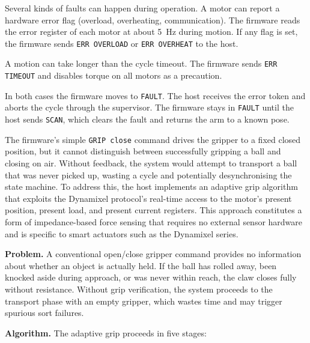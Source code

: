 Several kinds of faults can happen during operation.
A motor can report a hardware error flag (overload, overheating,
communication). The firmware reads the error register of each motor
at about 5~Hz during motion. If any flag is set, the firmware sends
\texttt{ERR OVERLOAD} or \texttt{ERR OVERHEAT} to the host.

A motion can take longer than the cycle timeout. The firmware sends
\texttt{ERR TIMEOUT} and disables torque on all motors as a
precaution.

In both cases the firmware moves to \texttt{FAULT}. The host receives
the error token and aborts the cycle through the supervisor.
The firmware stays in
\texttt{FAULT} until the host sends \texttt{SCAN}, which clears the
fault and returns the arm to a known pose.



The firmware's simple \texttt{GRIP close} command drives the gripper
to a fixed closed position, but it cannot distinguish between
successfully gripping a ball and closing on air. Without feedback,
the system would attempt to transport a ball that was never picked
up, wasting a cycle and potentially desynchronising the state
machine. To address this, the host implements an adaptive grip
algorithm that exploits the Dynamixel protocol's real-time access
to the motor's present position, present load, and present current
registers. This approach constitutes a form of impedance-based
force sensing that requires no external sensor hardware and is
specific to smart actuators such as the Dynamixel series.

\textbf{Problem.} A conventional open/close gripper command
provides no information about whether an object is actually held.
If the ball has rolled away, been knocked aside during approach,
or was never within reach, the claw closes fully without
resistance. Without grip verification, the system proceeds to the
transport phase with an empty gripper, which wastes time and may
trigger spurious sort failures.

\textbf{Algorithm.} The adaptive grip proceeds in five stages:

